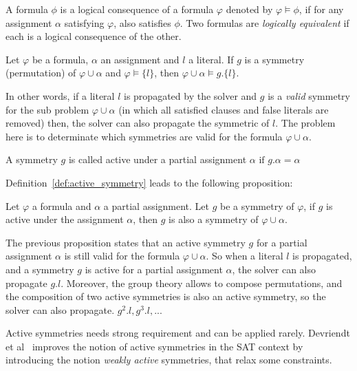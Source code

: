 \begin{definition}
 \label{def:logical_consequence}
 A formula $\phi$ is a logical consequence of a formula $\varphi$ denoted by $\varphi \models \phi$, if for any assignment
 $\alpha$ satisfying $\varphi$, also satisfies $\phi$. Two formulas are \emph{logically equivalent} if each is a logical
 consequence of the other.
\end{definition}
\begin{proposition}
 \label{prop:symmetry_propagation}
 Let $\varphi$ be a formula, $\alpha$ an assignment and $l$ a literal. 
 If $g$ is a symmetry (permutation) of $\varphi \cup \alpha$ and
 $\varphi \models \{l\}$, then $\varphi \cup \alpha \models g.\{l\}$.
\end{proposition}
In other words, if a literal $l$ is propagated by the solver and $g$ is a \emph{valid} symmetry for the
sub problem $\varphi \cup \alpha$ (in which all satisfied clauses and false literals are removed) then, the solver can
also propagate the symmetric of $l$. The problem here is to determinate which symmetries are valid for the formula
$\varphi \cup \alpha$.
\begin{definition}
 \label{def:active_symmetry}
 A symmetry $g$ is called active under a partial assignment $\alpha$ $\text{if } g.\alpha = \alpha$
\end{definition}
Definition~\ref{def:active_symmetry} leads to the following proposition:
\begin{proposition}
 \label{prop:active_symmetry}
 Let $\varphi$ a formula and $\alpha$ a partial assignment. Let $g$ be a symmetry of $\varphi$,
 if $g$ is active under the assignment $\alpha$, then $g$ is also a symmetry of $\varphi \cup \alpha$.
\end{proposition}
The previous proposition states that an active symmetry $g$ for a partial assignment $\alpha$ is still valid for
the formula $\varphi \cup \alpha$. So when a literal $l$ is propagated, and a symmetry $g$ is active for a
partial assignment $\alpha$, the solver can also propagate $g.l$. 
Moreover, the group theory allows to compose permutations, and the composition of two active symmetries is also an active symmetry, so the solver can also propagate. $g^2.l, g^3.l, ... $


Active symmetries needs strong requirement and can be applied rarely.
Devriendt et al~\cite{Devriendt12} improves the notion of active symmetries in the SAT context by
introducing the notion \emph{weakly active} symmetries, that relax some constraints.

